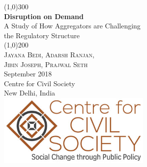 \documentclass[a4paper, 12pt]{article}
\begin{document}
                    
                    \begin{titlepage}
                    	\begin{center}
                    	\line(1,0){300}\\
                    	[0.25in]
                    	\huge{\bfseries \textcolor{CCSbrown} {Disruption on Demand}} \\
    	[0.5cm]
    	\large  {A Study of How Aggregators are Challenging \\ the Regulatory Structure} \\
    	
                    	\line(1,0){200}\\
                    	[1in]
                    	\textsc{\Large Jayana Bedi, Adarsh Ranjan, \\ Jibin Joseph, Prajwal Seth} \\
                    	[1.5cm]
                    	{\Large September 2018} \\
                    	[2.0cm]
                    	{\LARGE Centre for Civil Society} \\
                    	[0.1mm]
                    	{\Large New Delhi, India} \\
    	[2.0cm]
    	 \includegraphics[width = 75mm]{CCSlogo.jpg}
      
                    	\end{center}
                    \end{titlepage}
                    \tableofcontents
                    
      
                    
                    \newpage
\end{document}

